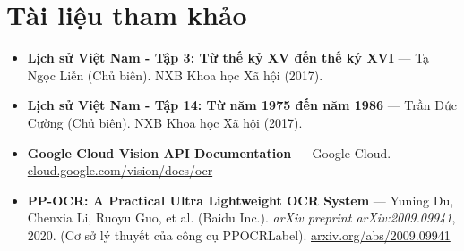 \documentclass[12pt]{article}
\begin{document}
\hypersetup{pageanchor=false}

\clearpage
\hypersetup{pageanchor=true}

\tableofcontents
\pagebreak

\setcounter{page}{1}


% 
% 
% 
% 
% 
% 
% 

\cleardoublepage
{}
{}
\section*{Tài liệu tham khảo}

\begin{itemize}
  \item \textbf{Lịch sử Việt Nam - Tập 3: Từ thế kỷ XV đến thế kỷ XVI} —  
  Tạ Ngọc Liễn (Chủ biên).  
  NXB Khoa học Xã hội (2017).

  \item \textbf{Lịch sử Việt Nam - Tập 14: Từ năm 1975 đến năm 1986} —  
  Trần Đức Cường (Chủ biên).  
  NXB Khoa học Xã hội (2017).

  \item \textbf{Google Cloud Vision API Documentation} — Google Cloud.  
  \href{https://cloud.google.com/vision/docs/ocr}{cloud.google.com/vision/docs/ocr}

  \item \textbf{PP-OCR: A Practical Ultra Lightweight OCR System} —  
  Yuning Du, Chenxia Li, Ruoyu Guo, et al. (Baidu Inc.).  
  \textit{arXiv preprint arXiv:2009.09941}, 2020. (Cơ sở lý thuyết của công cụ PPOCRLabel).  
  \href{https://arxiv.org/abs/2009.09941}{arxiv.org/abs/2009.09941}

\end{itemize}

\appendix
% 
\end{document}
